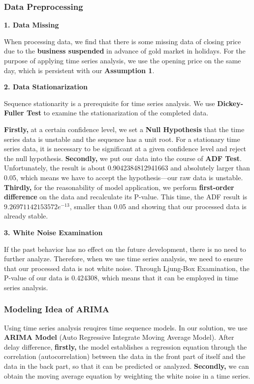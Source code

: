 \documentclass{mcmthesis}
\begin{document}
\subsubsection{Data Preprocessing}

\noindent \textbf{1. Data Missing}
\par When processing data, we find that there is some missing data of closing price due to the \textbf{business suspended} in advance of gold market in holidays. For the purpose of applying time series analysis, we use the opening price on the same day, which is persistent with our \textbf{Assumption 1}. 
\par \noindent \textbf{2. Data Stationarization}
\par Sequence stationarity is a prerequisite for time series analysis. We use \textbf{Dickey-Fuller Test} to examine the stationarization of the completed data. 
\par \textbf{Firstly,} at a certain confidence level, we set a \textbf{Null Hypothesis} that the time series data is unstable and the sequence has a unit root. For a stationary time series data, it is necessary to be significant at a given confidence level and reject the null hypothesis. \textbf{Secondly,} we put our data into the course of \textbf{ADF Test}. Unfortunately, the result is about 0.9042384812941663 and absolutely larger than 0.05, which means we have to accept the hypothesis---our raw data is unstable. \textbf{Thirdly,} for the reasonability of model application, we perform \textbf{first-order difference} on the data and recalculate its P-value. This time, the ADF result is $ 9.26971142153572e^{-13} $, smaller than 0.05 and showing that our processed data is already stable.
\par \noindent \textbf{3. White Noise Examination}
\par If the past behavior has no effect on the future development, there is no need to further analyze. Therefore, when we use time series analysis, we need to ensure that our processed data is not white noise. Through Ljung-Box Examination, the P-value of our data is 0.424308, which means that it can be employed in time series analysis.

\subsubsection{Modeling Idea of ARIMA}
\par Using time series analysis reuqires time sequence models. In our solution, we use \textbf{ARIMA Model} (Auto Regressive Integrate Moving Average Model). After delay difference, \textbf{firstly,} the model establishes a regression equation through the correlation (autocorrelation) between the data in the front part of itself and the data in the back part, so that it can be predicted or analyzed. \textbf{Secondly,} we can obtain the moving average equation by weighting the white noise in a time series. 
\end{document}
